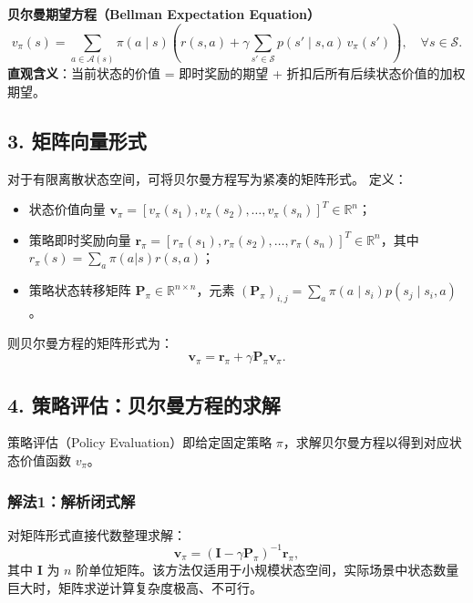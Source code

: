 \documentclass[UTF8]{article}
\begin{document}
\begin{theorembox}
  \textbf{贝尔曼期望方程（Bellman Expectation Equation）}
  \begin{equation} \label{eq:bellman_expect}
    v_\pi(s) = \sum_{a \in \mathcal{A}(s)} \pi(a \mid s) \left( r(s,a) + \gamma \sum_{s' \in \mathcal{S}} p(s' \mid s,a) \, v_\pi(s') \right), \quad \forall s \in \mathcal{S}.
  \end{equation}
  \textbf{直观含义}：当前状态的价值 = 即时奖励的期望 + 折扣后所有后续状态价值的加权期望。
\end{theorembox}

\subsection*{3. 矩阵向量形式}
对于有限离散状态空间，可将贝尔曼方程写为紧凑的矩阵形式。
定义：
\begin{itemize}
  \item 状态价值向量 $\boldsymbol{v}_\pi = \left[ v_\pi(s_1), v_\pi(s_2), \dots, v_\pi(s_n) \right]^T \in \mathbb{R}^n$；
  \item 策略即时奖励向量 $\boldsymbol{r}_\pi = \left[ r_\pi(s_1), r_\pi(s_2), \dots, r_\pi(s_n) \right]^T \in \mathbb{R}^n$，其中 $r_\pi(s) = \sum_a \pi(a|s) r(s,a)$；
  \item 策略状态转移矩阵 $\boldsymbol{P}_\pi \in \mathbb{R}^{n \times n}$，元素 $(\boldsymbol{P}_\pi)_{i,j} = \sum_a \pi(a \mid s_i) p(s_j \mid s_i,a)$。
\end{itemize}
则贝尔曼方程的矩阵形式为：
\begin{equation} \label{eq:bellman_matrix}
  \boldsymbol{v}_\pi = \boldsymbol{r}_\pi + \gamma \boldsymbol{P}_\pi \boldsymbol{v}_\pi.
\end{equation}

\subsection*{4. 策略评估：贝尔曼方程的求解}
策略评估（Policy Evaluation）即给定固定策略 $\pi$，求解贝尔曼方程以得到对应状态价值函数 $v_\pi$。

\subsubsection*{解法1：解析闭式解}
对矩阵形式直接代数整理求解：
\[
  \boldsymbol{v}_\pi = \left( \boldsymbol{I} - \gamma \boldsymbol{P}_\pi \right)^{-1} \boldsymbol{r}_\pi,
\]
其中 $\boldsymbol{I}$ 为 $n$ 阶单位矩阵。该方法仅适用于小规模状态空间，实际场景中状态数量巨大时，矩阵求逆计算复杂度极高、不可行。
\end{document}
